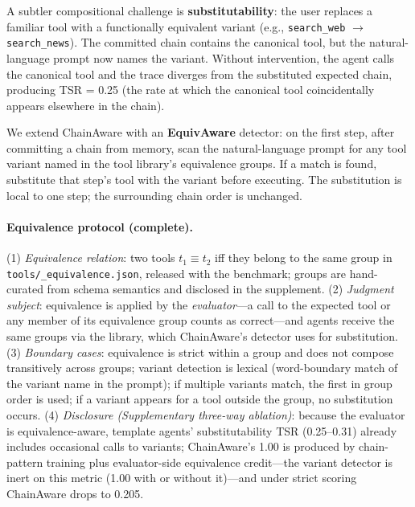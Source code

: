 ﻿\documentclass{article}
\begin{document}
A subtler compositional challenge is {\bf substitutability}: the user replaces a familiar tool with a functionally equivalent variant (e.g., \texttt{search\_web} $\to$ \texttt{search\_news}). The committed chain contains the canonical tool, but the natural-language prompt now names the variant. Without intervention, the agent calls the canonical tool and the trace diverges from the substituted expected chain, producing TSR = 0.25 (the rate at which the canonical tool coincidentally appears elsewhere in the chain).

We extend ChainAware with an {\bf EquivAware} detector: on the first step, after committing a chain from memory, scan the natural-language prompt for any tool variant named in the tool library's equivalence groups. If a match is found, substitute that step's tool with the variant before executing. The substitution is local to one step; the surrounding chain order is unchanged.

\paragraph{Equivalence protocol (complete).} (1) \emph{Equivalence relation}: two tools $t_1 \equiv t_2$ iff they belong to the same group in \texttt{tools/\_equivalence.json}, released with the benchmark; groups are hand-curated from schema semantics and disclosed in the supplement. (2) \emph{Judgment subject}: equivalence is applied by the \emph{evaluator}---a call to the expected tool or any member of its equivalence group counts as correct---and agents receive the same groups via the library, which ChainAware's detector uses for substitution. (3) \emph{Boundary cases}: equivalence is strict within a group and does not compose transitively across groups; variant detection is lexical (word-boundary match of the variant name in the prompt); if multiple variants match, the first in group order is used; if a variant appears for a tool outside the group, no substitution occurs. (4) \emph{Disclosure (Supplementary three-way ablation)}: because the evaluator is equivalence-aware, template agents' substitutability TSR (0.25--0.31) already includes occasional calls to variants; ChainAware's 1.00 is produced by chain-pattern training plus evaluator-side equivalence credit---the variant detector is inert on this metric (1.00 with or without it)---and under strict scoring ChainAware drops to 0.205.
\end{document}
